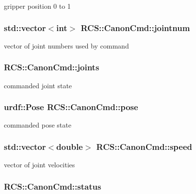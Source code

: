 gripper position 0 to 1 \hypertarget{structRCS_1_1CanonCmd_a1fb8395cab4ebddddafd37e7387f9ff8}{
\subsubsection[{jointnum}]{\setlength{\rightskip}{0pt plus 5cm}std\-::vector$<$int$>$ R\-C\-S\-::\-Canon\-Cmd\-::jointnum}}\label{structRCS_1_1CanonCmd_a1fb8395cab4ebddddafd37e7387f9ff8}
vector of joint numbers used by command \hypertarget{structRCS_1_1CanonCmd_aca799c5c818f28f0d9f4797b325b03de}{
\subsubsection[{joints}]{ R\-C\-S\-::\-Canon\-Cmd\-::joints}}\label{structRCS_1_1CanonCmd_aca799c5c818f28f0d9f4797b325b03de}
commanded joint state \hypertarget{structRCS_1_1CanonCmd_a6a2fbf785ca8d96d520a2d3260bc6746}{
\subsubsection[{pose}]{\setlength{\rightskip}{0pt plus 5cm}urdf\-::\-Pose R\-C\-S\-::\-Canon\-Cmd\-::pose}}\label{structRCS_1_1CanonCmd_a6a2fbf785ca8d96d520a2d3260bc6746}
commanded pose state \hypertarget{structRCS_1_1CanonCmd_aa31954bd04399469490123786ee17496}{
\subsubsection[{speed}]{\setlength{\rightskip}{0pt plus 5cm}std\-::vector$<$double$>$ R\-C\-S\-::\-Canon\-Cmd\-::speed}}\label{structRCS_1_1CanonCmd_aa31954bd04399469490123786ee17496}
vector of joint velocities \hypertarget{structRCS_1_1CanonCmd_a8ad6bd631d2cf99c00ec267791680236}{
\subsubsection[{status}]{ R\-C\-S\-::\-Canon\-Cmd\-::status}}\label{structRCS_1_1CanonCmd_a8ad6bd631d2cf99c00ec267791680236}
